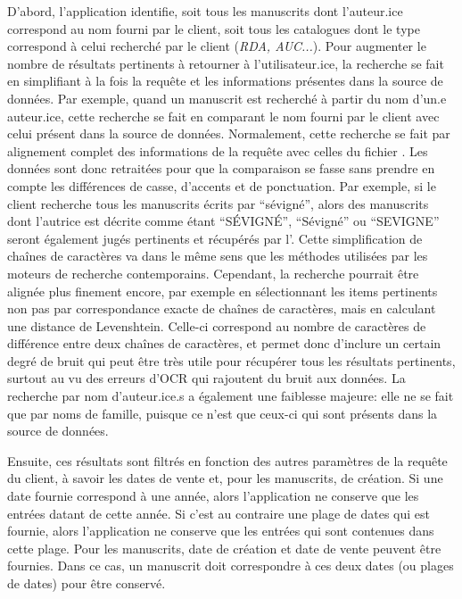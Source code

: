 D'abord, l'application identifie, soit tous les manuscrits dont l'auteur.ice correspond au nom fourni par le client, soit tous les catalogues dont le type correspond à celui recherché par le client (\textit{RDA, AUC...}). Pour augmenter le nombre de résultats pertinents à retourner à l'utilisateur.ice, la recherche se fait en simplifiant à la fois la requête et les informations présentes dans la source de données. Par exemple, quand un manuscrit est recherché à partir du nom d'un.e auteur.ice, cette recherche se fait en comparant le nom fourni par le client avec celui présent dans la source de données. Normalement, cette recherche se fait par alignement complet des informations de la requête avec celles du fichier \json{}. Les données sont donc retraitées pour que la comparaison se fasse sans prendre en compte les différences de casse, d'accents et de ponctuation. Par exemple, si le client recherche tous les manuscrits écrits par \enquote{sévigné}, alors des manuscrits dont l'autrice est décrite comme étant \enquote{SÉVIGNÉ}, \enquote{Sévigné} ou \enquote{SEVIGNE} seront également jugés pertinents et récupérés par l'\api{}. Cette simplification de chaînes de caractères va dans le même sens que les méthodes utilisées par les moteurs de recherche contemporains. Cependant, la recherche pourrait être alignée plus finement encore, par exemple en sélectionnant les items pertinents non pas par correspondance exacte de chaînes de caractères, mais en calculant une distance de Levenshtein. Celle-ci correspond au nombre de caractères de différence entre deux chaînes de caractères, et permet donc d'inclure un certain degré de bruit qui peut être très utile pour récupérer tous les résultats pertinents, surtout au vu des erreurs d'OCR qui rajoutent du bruit aux données. La recherche par nom d'auteur.ice.s a également une faiblesse majeure: elle ne se fait que par noms de famille, puisque ce n'est que ceux-ci qui sont présents dans la source de données.

Ensuite, ces résultats sont filtrés en fonction des autres paramètres de la requête du client, à savoir les dates de vente et, pour les manuscrits, de création. Si une date fournie correspond à une année, alors l'application ne conserve que les entrées datant de cette année. Si c'est au contraire une plage de dates qui est fournie, alors l'application ne conserve que les entrées qui sont contenues dans cette plage. Pour les manuscrits, date de création et date de vente peuvent être fournies. Dans ce cas, un manuscrit doit correspondre à ces deux dates (ou plages de dates) pour être conservé.

